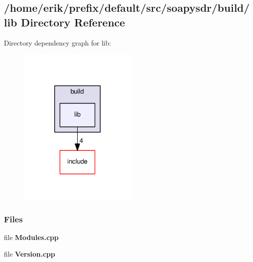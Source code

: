 \subsection{/home/erik/prefix/default/src/soapysdr/build/lib Directory Reference}
\label{dir_0d19c13c92b68f304748fb3f6084802f}
Directory dependency graph for lib\+:
\nopagebreak
\begin{figure}[H]
\begin{center}
\leavevmode
\includegraphics[width=166pt]{dir_0d19c13c92b68f304748fb3f6084802f_dep}
\end{center}
\end{figure}
\subsubsection*{Files}
\begin{DoxyCompactItemize}
\item 
file {\bf Modules.\+cpp}
\item 
file {\bf Version.\+cpp}
\end{DoxyCompactItemize}
